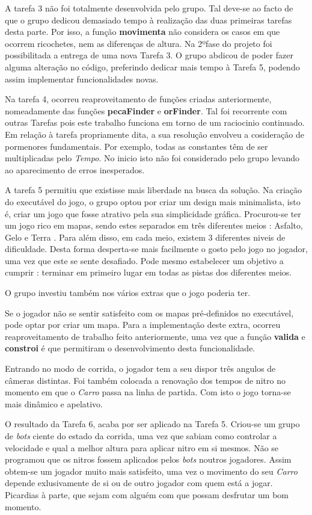 \documentclass[a4paper]{report} %
\begin{document}
A tarefa 3 não foi totalmente desenvolvida pelo grupo. Tal deve-se ao facto de que o grupo dedicou demasiado tempo à realização das duas primeiras tarefas desta parte. Por isso, a função \textbf{movimenta} não considera os casos em que ocorrem ricochetes, nem as diferenças de altura. Na 2ºfase do projeto foi possibilitada a entrega de uma nova Tarefa 3. O grupo abdicou de poder fazer alguma alteração no código, preferindo dedicar mais tempo à Tarefa 5, podendo assim implementar funcionalidades novas.

Na tarefa 4, ocorreu reaproveitamento de funções criadas anteriormente, nomeadamente das funções \textbf{pecaFinder} e \textbf {orFinder}. Tal foi recorrente com outras Tarefas pois este trabalho funciona em torno de um raciocinio continuado. Em relação à tarefa propriamente dita, a sua resolução envolveu a cosideração de pormenores fundamentais. Por exemplo, todas as constantes têm de ser multiplicadas pelo \emph{Tempo}. No inicio isto não foi considerado pelo grupo levando ao aparecimento de erros inesperados.

A tarefa 5 permitiu que existisse mais liberdade na busca da solução. Na criação do executável do jogo, o grupo optou por criar um design mais minimalista, isto é, criar um jogo que fosse atrativo pela sua simplicidade gráfica. Procurou-se ter um jogo rico em mapas, sendo estes separados em três diferentes meios : Asfalto, Gelo e Terra . Para além disso, em cada meio, existem 3 diferentes niveis de dificuldade. Desta forma desperta-se mais facilmente o gosto pelo jogo no jogador, uma vez que este se sente desafiado. Pode mesmo estabelecer um objetivo a cumprir : terminar em primeiro lugar em todas as pistas dos diferentes meios.

O grupo investiu também nos vários extras que o jogo poderia ter. 

Se o jogador não se sentir satisfeito com os mapas pré-definidos no executável, pode optar por criar um mapa. Para a implementação deste extra, ocorreu reaproveitamento de trabalho feito anteriormente, uma vez que a função \textbf{valida} e \textbf{constroi} é que permitiram o desenvolvimento desta funcionalidade.

Entrando no modo de corrida, o jogador tem a seu dispor três angulos de câmeras distintas. Foi também colocada a renovação dos tempos de nitro no momento em que o \emph{Carro} passa na linha de partida. Com isto o jogo torna-se mais dinâmico e apelativo.

O resultado da Tarefa 6, acaba por ser aplicado na Tarefa 5. Criou-se um grupo de \textit{bots} ciente do estado da corrida, uma vez que sabiam como controlar a velocidade e qual a melhor altura para aplicar nitro em si mesmos. Não se programou que os nitros fossem aplicados pelos \emph{bots} noutros jogadores. Assim obtem-se um jogador muito mais satisfeito, uma vez o movimento do seu \emph{Carro} depende exlusivamente de si ou de outro jogador com quem está a jogar. Picardias à parte, que sejam com alguém com que possam desfrutar um bom momento.
\end{document}

